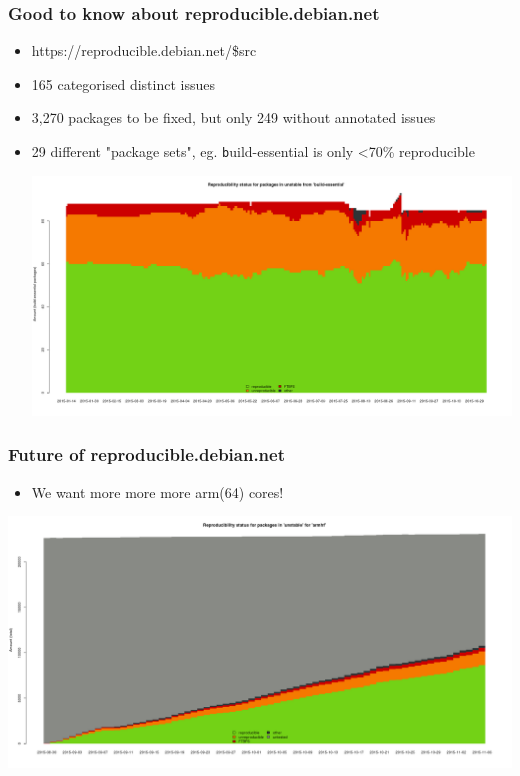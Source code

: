 \documentclass[14pt]{beamer}
\begin{document}
\begin{frame}
 \frametitle{Good to know about reproducible.debian.net}

 \begin{itemize}
  \item https://reproducible.debian.net/\$src
  \item<2-3> { 165 categorised distinct issues }
  \item<2-3> { 3,270 packages to be fixed, but only 249 without annotated
  issues }
  \item<3> { 29 different "package sets", eg. \texttt build-essential is only <70\%
  reproducible
   \begin{center}
    \includegraphics[height=0.35\paperheight]{images/stats_meta_pkg_state_build-essential.png}
   \vfill
 \end{center}
  }
 \end{itemize}
\end{frame}

\begin{frame}
 \frametitle{Future of reproducible.debian.net}

 \begin{itemize}
 \item We want more more more arm(64) cores!
 \end{itemize}
 \begin{center}
  \includegraphics[height=0.5\paperheight]{images/stats_pkg_state_armhf.png}
  \vfill
 \end{center}
\end{frame}
\end{document}
